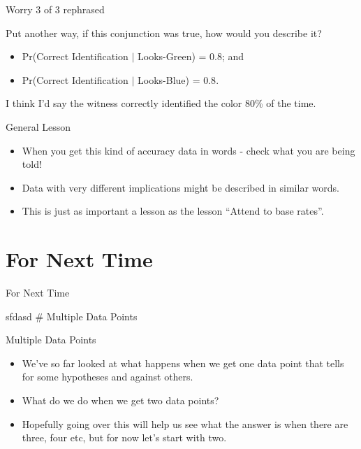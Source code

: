 \documentclass[
  ignorenonframetext,
]{beamer}
\providecommand{\tightlist}{%
  \setlength{\itemsep}{0pt}\setlength{\parskip}{0pt}}
\renewcommand{\,}{\text{, }}
\begin{document}
\begin{frame}{Worry 3 of 3 rephrased}
\protect\hypertarget{worry-3-of-3-rephrased}{}

Put another way, if this conjunction was true, how would you describe
it?

\begin{itemize}
\tightlist
\item
  Pr(Correct Identification \(|\) Looks-Green) = \(0.8\); and
\item
  Pr(Correct Identification \(|\) Looks-Blue) = \(0.8\). \pause
\end{itemize}

I think I'd say the witness correctly identified the color 80\% of the
time.

\end{frame}

\begin{frame}{General Lesson}
\protect\hypertarget{general-lesson}{}

\begin{itemize}
\tightlist
\item
  When you get this kind of accuracy data in words - check what you are
  being told!
\item
  Data with very different implications might be described in similar
  words.
\item
  This is just as important a lesson as the lesson ``Attend to base
  rates''.
\end{itemize}

\end{frame}

\hypertarget{for-next-time-6}{%
\section{For Next Time}\label{for-next-time-6}}

\begin{frame}{For Next Time}
\protect\hypertarget{for-next-time-7}{}

sfdasd \# Multiple Data Points

\end{frame}

\begin{frame}{Multiple Data Points}
\protect\hypertarget{multiple-data-points}{}

\begin{itemize}
\tightlist
\item
  We've so far looked at what happens when we get one data point that
  tells for some hypotheses and against others.
\item
  What do we do when we get two data points?
\item
  Hopefully going over this will help us see what the answer is when
  there are three, four etc, but for now let's start with two.
\end{itemize}

\end{frame}
\end{document}
